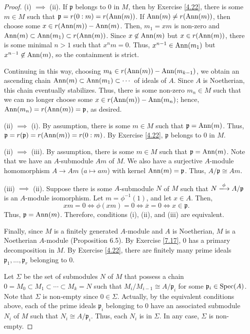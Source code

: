 \begin{proof}
(i) $\implies$ (ii). If $\mathfrak{p}$ belongs to $0$ in $M$, then by Exercise \ref{4.22}, there is some $m \in M$ such that $\mathfrak{p} = r(0 : m) = r(\operatorname{Ann}(m))$. If $\operatorname{Ann}(m)
\neq r(\operatorname{Ann}(m))$, then choose some $x \in r(\operatorname{Ann}(m)) - \operatorname{Ann}(m)$. Then, $m_1 = xm$ is non-zero and $\operatorname{Ann}(m) \subset \operatorname{Ann}(m_1) \subset r(\operatorname{Ann}(m))$. Since $x \not\in \operatorname{Ann}(m)$ but 
$x \in r(\operatorname{Ann}(m))$, there is some minimal $n > 1$ such that $x^n m = 0$. Thus, $x^{n-1} \in \operatorname{Ann}(m_1)$ but $x^{n-1} \not\in \operatorname{Ann}(m)$, so the containment is strict.

Continuing in this way, choosing $m_k \in r(\operatorname{Ann}(m)) - \operatorname{Ann}(m_{k-1})$, we obtain an ascending chain $\operatorname{Ann}(m) \subset \operatorname{Ann}(m_1) \subset \cdots$ of ideals of $A$. Since $A$ is Noetherian, 
this chain eventually stabilizes. Thus, there is some non-zero $m_n \in M$ such that we can no longer choose some $x \in r(\operatorname{Ann}(m)) - \operatorname{Ann}(m_n)$; hence, 
$\operatorname{Ann}(m_n) = r(\operatorname{Ann}(m)) = \mathfrak{p}$, as desired.

(ii) $\implies$ (i). By assumption, there is some $m \in M$ such that $\mathfrak{p} = \operatorname{Ann}(m)$. Thus, $\mathfrak{p} = r(\mathfrak{p}) = r(\operatorname{Ann}(m)) = r(0 : m)$. By Exercise \ref{4.22},
$\mathfrak{p}$ belongs to $0$ in $M$.

(ii) $\implies$ (iii). By assumption, there is some $m \in M$ such that $\mathfrak{p} = \operatorname{Ann}(m)$. Note that we have an $A$-submodule $Am$ of $M$. We also have a surjective $A$-module
homomorphism $A \to Am$ ($a \mapsto am$) with kernel $\operatorname{Ann}(m) = \mathfrak{p}$. Thus, $A/\mathfrak{p} \cong Am$.

(iii) $\implies$ (ii). Suppose there is some $A$-submodule $N$ of $M$ such that $N \xlongrightarrow{\phi} A/\mathfrak{p}$ is an $A$-module isomorphism. Let $m = \phi^{-1}(1)$,
and let $x \in A$. Then, $$xm = 0 \iff \phi(xm) = 0 \iff \overline{x} = 0 \iff x \in \mathfrak{p}.$$
Thus, $\mathfrak{p} = \operatorname{Ann}(m)$. Therefore, conditions (i), (ii), and (iii) are equivalent.

Finally, since $M$ is a finitely generated $A$-module and $A$ is Noetherian, $M$ is a Noetherian $A$-module (Proposition 6.5). By Exercise \ref{7.17}, $0$ has a primary
decomposition in $M$. By Exercise \ref{4.22}, there are finitely many prime ideals $\mathfrak{p}_1,\ldots,\mathfrak{p}_r$ belonging to $0$.

Let $\Sigma$ be the set of submodules $N$ of $M$ that possess a chain $0 = M_0 \subset M_1 \subset \cdots \subset M_k = N$ such that $M_i/M_{i-1} \cong A/\mathfrak{p}_i$
for some $\mathfrak{p}_i \in \operatorname{Spec}(A)$. Note that $\Sigma$ is non-empty since $0 \in \Sigma$. Actually, by the equivalent conditions above, each of the prime ideals $\mathfrak{p}_i$
belonging to $0$ have an associated submodule $N_i$ of $M$ such that $N_i \cong A/\mathfrak{p}_i$. Thus, each $N_i$ is in $\Sigma$. In any case, $\Sigma$ is non-empty.


\end{proof}
